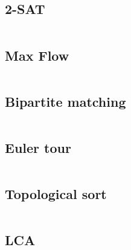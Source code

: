 \subsection{2-SAT}
\inputminted[frame=single,framesep=3pt,breaklines=true,tabsize=2,linenos,label=O(E+V)]{c++}{graph/two-sat.cpp}

\subsection{Max Flow}
\inputminted[frame=single,framesep=3pt,breaklines=true,tabsize=2,linenos,label=O($V^2 E$)]{c++}{graph/max-flow.cpp}

\subsection{Bipartite matching}
\inputminted[frame=single,framesep=3pt,breaklines=true,tabsize=2,linenos,label=O($V E$)]{c++}{graph/bipartite-matching.cpp}

\subsection{Euler tour}
\inputminted[frame=single,framesep=3pt,breaklines=true,tabsize=2,linenos,label=O($V^2 E$)]{c++}{graph/euler-tour.cpp}

\subsection{Topological sort}
\inputminted[frame=single,framesep=3pt,breaklines=true,tabsize=2,linenos,label=O(E+V)]{c++}{graph/topo-sort.cpp}

\subsection{LCA}
\inputminted[frame=single,framesep=3pt,breaklines=true,tabsize=2,linenos,label=O(E+V)]{c++}{graph/lca.cpp}